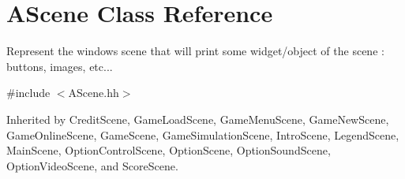 \hypertarget{classAScene}{}\section{A\+Scene Class Reference}
\label{classAScene}


Represent the window\textquotesingle{}s scene that will print some widget/object of the scene \+: buttons, images, etc...  




{\ttfamily \#include $<$A\+Scene.\+hh$>$}



Inherited by Credit\+Scene, Game\+Load\+Scene, Game\+Menu\+Scene, Game\+New\+Scene, Game\+Online\+Scene, Game\+Scene, Game\+Simulation\+Scene, Intro\+Scene, Legend\+Scene, Main\+Scene, Option\+Control\+Scene, Option\+Scene, Option\+Sound\+Scene, Option\+Video\+Scene, and Score\+Scene.

